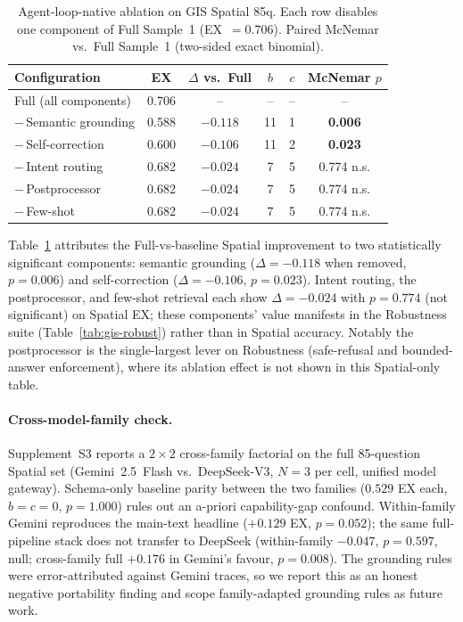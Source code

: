 \documentclass[11pt]{article}
\begin{document}
\begin{table}[t]
\centering
\caption{Agent-loop-native ablation on GIS Spatial 85q. Each row disables one component of Full Sample~1 (EX~$=0.706$). Paired McNemar vs.\ Full Sample~1 (two-sided exact binomial).}
\label{tab:ablation}
\begin{tabular}{lccccc}
\toprule
Configuration & EX & $\Delta$ vs.\ Full & $b$ & $c$ & McNemar $p$ \\
\midrule
Full (all components)     & 0.706 & --       & --  & --  & -- \\
$-$\,Semantic grounding   & 0.588 & $-0.118$ & 11  & 1   & \textbf{0.006} \\
$-$\,Self-correction      & 0.600 & $-0.106$ & 11  & 2   & \textbf{0.023} \\
$-$\,Intent routing       & 0.682 & $-0.024$ & 7   & 5   & 0.774 n.s. \\
$-$\,Postprocessor        & 0.682 & $-0.024$ & 7   & 5   & 0.774 n.s. \\
$-$\,Few-shot             & 0.682 & $-0.024$ & 7   & 5   & 0.774 n.s. \\
\bottomrule
\end{tabular}
\end{table}

Table~\ref{tab:ablation} attributes the Full-vs-baseline Spatial improvement to two statistically significant components: semantic grounding ($\Delta = -0.118$ when removed, $p=0.006$) and self-correction ($\Delta = -0.106$, $p=0.023$). Intent routing, the postprocessor, and few-shot retrieval each show $\Delta = -0.024$ with $p=0.774$ (not significant) on Spatial EX; these components' value manifests in the Robustness suite (Table~\ref{tab:gis-robust}) rather than in Spatial accuracy. Notably the postprocessor is the single-largest lever on Robustness (safe-refusal and bounded-answer enforcement), where its ablation effect is not shown in this Spatial-only table.

\paragraph{Cross-model-family check.} Supplement~S3 reports a $2{\times}2$ cross-family factorial on the full 85-question Spatial set (Gemini~2.5~Flash vs.\ DeepSeek-V3, $N{=}3$ per cell, unified model gateway). Schema-only baseline parity between the two families ($0.529$ EX each, $b{=}c{=}0$, $p{=}1.000$) rules out an a-priori capability-gap confound. Within-family Gemini reproduces the main-text headline ($+0.129$ EX, $p=0.052$); the same full-pipeline stack does not transfer to DeepSeek (within-family $-0.047$, $p=0.597$, null; cross-family full $+0.176$ in Gemini's favour, $p=0.008$). The grounding rules were error-attributed against Gemini traces, so we report this as an honest negative portability finding and scope family-adapted grounding rules as future work.
\end{document}
